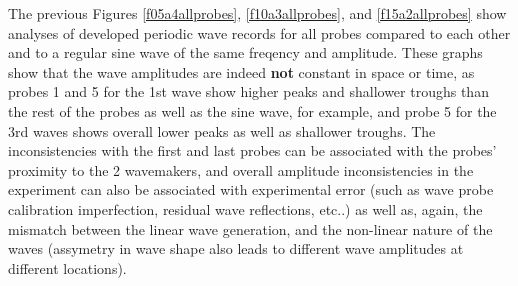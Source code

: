 \documentclass{article}
\begin{document}
	The previous Figures \ref{f05a4allprobes}, \ref{f10a3allprobes}, and \ref{f15a2allprobes} show analyses of developed periodic wave records for all probes compared to each other and to a regular sine wave of the same freqency and amplitude. These graphs show that the wave amplitudes are indeed \textbf{not} constant in space or time, as probes 1 and 5 for the 1st wave show higher peaks and shallower troughs than the rest of the probes as well as the sine wave, for example, and probe 5 for the 3rd waves shows overall lower peaks as well as shallower troughs. The inconsistencies with the first and last probes can be associated with the probes' proximity to the 2 wavemakers, and overall amplitude inconsistencies in the experiment can also be associated with experimental error (such as wave probe calibration imperfection, residual wave reflections, etc..) as well as, again, the mismatch between the linear wave generation, and the non-linear nature of the waves (assymetry in wave shape also leads to different wave amplitudes at different locations).
\end{document}
